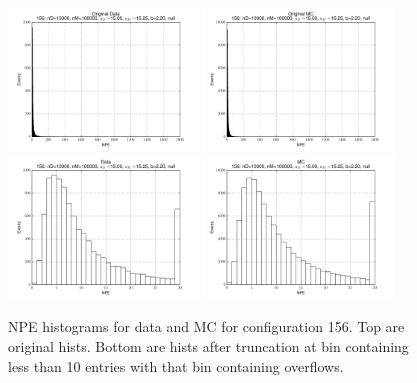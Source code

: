  \begin{figure}[htbp] \begin{center} 
\includegraphics[width=0.45\textwidth]{../FIGURES/156/FIG_Original_Data.pdf} 
\includegraphics[width=0.45\textwidth]{../FIGURES/156/FIG_Original_MC.pdf} 
\includegraphics[width=0.45\textwidth]{../FIGURES/156/FIG_Data.pdf} 
\includegraphics[width=0.45\textwidth]{../FIGURES/156/FIG_MC.pdf} 
\caption{NPE histograms for data and MC for configuration 156. Top are original hists. Bottom are hists after truncation at bin containing less than 10 entries with that bin containing overflows.} 
\label{tab:npe_156} 
\end{center} \end{figure} 
\clearpage
 